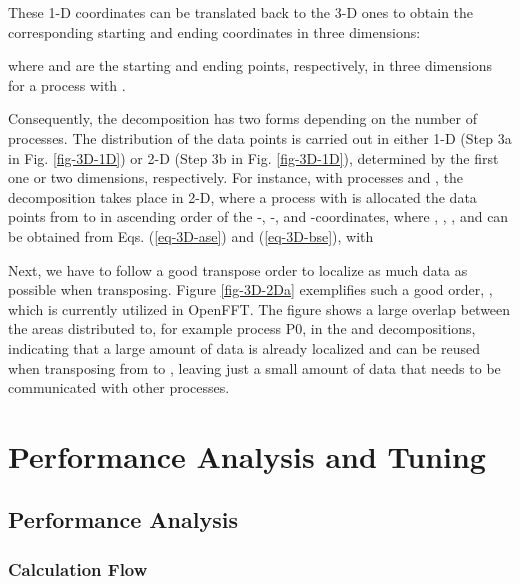 These 1-D coordinates can be translated back to the 3-D ones to obtain the corresponding starting and ending coordinates in three dimensions:  



where  and  are the starting and ending points, respectively, in three dimensions for a process with .

Consequently, the decomposition has two forms depending on the number of processes. The distribution of the data points is carried out in either 1-D (Step 3a in Fig. \ref{fig-3D-1D}) or 2-D (Step 3b in Fig. \ref{fig-3D-1D}), determined by the first one or two dimensions, respectively. For instance, with  processes and , the  decomposition takes place in 2-D, where a process with  is allocated the data points from  to  in ascending order of the -, -, and -coordinates, where , , , and  can be obtained from Eqs. (\ref{eq-3D-ase}) and (\ref{eq-3D-bse}), with


\begin{comment}





\end{comment}

Next, we have to follow a good transpose order to localize as much data as possible when transposing. Figure \ref{fig-3D-2Da} exemplifies such a good order, , which is currently utilized in OpenFFT. The figure shows a large overlap between the areas distributed to, for example process P0, in the  and  decompositions, indicating that a large amount of data is already localized and can be reused when transposing from  to , leaving just a small amount of data that needs to be communicated with other processes.



\section{Performance Analysis and Tuning}

\subsection{Performance Analysis}

\subsubsection{Calculation Flow}

